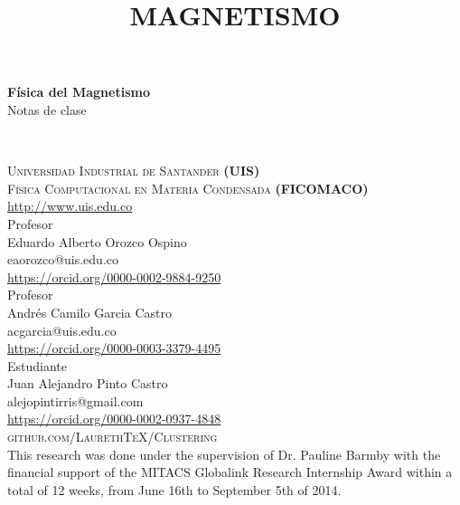 \title{MAGNETISMO}
\begingroup
\thispagestyle{empty}
\centering
\vspace*{5cm}
\par\normalfont\fontsize{35}{35}\sffamily\selectfont
\textbf{Física del Magnetismo}\\
{\LARGE Notas de clase}\par
\vspace*{1cm}
\endgroup
\newpage
~\vfill
\thispagestyle{empty}

\noindent \textsc{Universidad Industrial de Santander \textbf{(UIS)} \\
Física Computacional en Materia Condensada  \textbf{(FICOMACO)}}\\
\url{http://www.uis.edu.co}\\

\noindent Profesor\\
Eduardo Alberto Orozco Ospino\\
eaorozco@uis.edu.co\\
\url{https://orcid.org/0000-0002-9884-9250}\\

\noindent Profesor\\
Andrés Camilo Garcia Castro\\
acgarcia@uis.edu.co\\
\url{https://orcid.org/0000-0003-3379-4495}\\

\noindent Estudiante\\
Juan Alejandro Pinto Castro\\
alejopintirris@gmail.com\\
\url{https://orcid.org/0000-0002-0937-4848}\\

\noindent \textsc{github.com/LaurethTeX/Clustering}\\ %

\noindent This research was done under the supervision of Dr. Pauline Barmby with the financial support of the MITACS Globalink Research Internship Award within a total of 12 weeks, from June 16th to September 5th of 2014.\\ %

